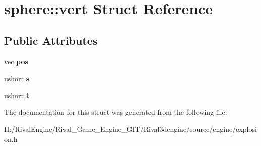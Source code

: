 \hypertarget{structsphere_1_1vert}{}\section{sphere\+:\+:vert Struct Reference}
\label{structsphere_1_1vert}
\subsection*{Public Attributes}
\begin{DoxyCompactItemize}
\item 
\mbox{\label{structsphere_1_1vert_a2a71496d265a4c99242b5bfe90c8f1c7}} 
\hyperlink{structvec}{vec} {\bfseries pos}
\item 
\mbox{\label{structsphere_1_1vert_abeb9860e31364f37b7ccd62a7f2cd9a1}} 
ushort {\bfseries s}
\item 
\mbox{\label{structsphere_1_1vert_a7871b3ea76d29e57256c46ab3331d65c}} 
ushort {\bfseries t}
\end{DoxyCompactItemize}


The documentation for this struct was generated from the following file\+:\begin{DoxyCompactItemize}
\item 
H\+:/\+Rival\+Engine/\+Rival\+\_\+\+Game\+\_\+\+Engine\+\_\+\+G\+I\+T/\+Rival3dengine/source/engine/explosion.\+h\end{DoxyCompactItemize}
